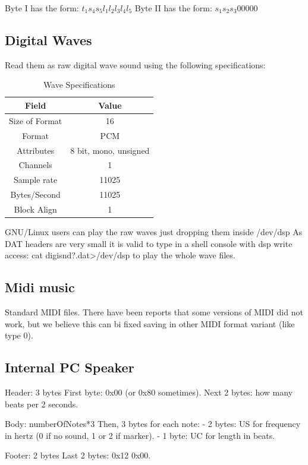 \documentclass{article}
\begin{document}
 Byte I  has the form: $t_1 s_4 s_5 l_1 l_2 l_3 l_4 l_5$
 Byte II has the form: $s_1 s_2 s_3  0  0  0  0  0$

\subsection{Digital Waves}
 Read them as raw digital wave sound using the following specifications:

\begin{table}
\begin{tabular}{cc}
\hline
  Field&Value\\
\hline
  Size of Format& 16 \\
  Format&         PCM \\
  Attributes&     8 bit, mono, unsigned \\
  Channels&       1 \\
  Sample rate&    11025 \\
  Bytes/Second&   11025 \\
  Block Align&    1 \\
\hline
\end{tabular}
\caption{Wave Specifications}
\label{wave specs}
\end{table}

 GNU/Linux users can play the raw waves just dropping them inside /dev/dsp
 As DAT headers are very small it is valid to type in a shell console with
 dsp write access: cat digisnd?.dat>/dev/dsp to play the whole wave files.

\subsection{Midi music}
 Standard MIDI files. There have been reports that some versions of MIDI
 did not work, but we believe this can bi fixed saving in other MIDI
 format variant (like type 0).

\subsection{Internal PC Speaker}
 Header: 3 bytes
  First byte: 0x00 (or 0x80 sometimes).
  Next 2 bytes: how many beats per 2 seconds.

 Body: numberOfNotes*3
  Then, 3 bytes for each note:
   - 2 bytes: US for frequency in hertz (0 if no sound, 1 or 2 if marker).
   - 1 byte:  UC for length in beats.

 Footer: 2 bytes
  Last 2 bytes: 0x12 0x00.
\end{document}
